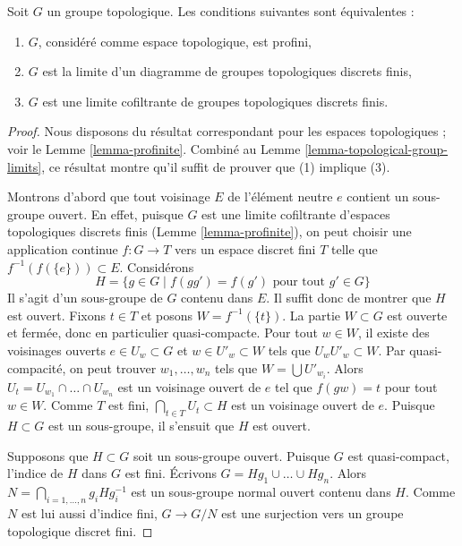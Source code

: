 \begin{lemma}
\label{lemma-profinite-group}
Soit $G$ un groupe topologique. Les conditions suivantes sont équivalentes :
\begin{enumerate}
\item $G$, considéré comme espace topologique, est profini,
\item $G$ est la limite d'un diagramme de groupes topologiques discrets finis,
\item $G$ est une limite cofiltrante de groupes topologiques discrets finis.
\end{enumerate}
\end{lemma}

\begin{proof}
Nous disposons du résultat correspondant pour les espaces topologiques ; voir
le Lemme \ref{lemma-profinite}. Combiné au
Lemme \ref{lemma-topological-group-limits}, ce résultat montre qu'il suffit de
prouver que (1) implique (3).

\medskip\noindent
Montrons d'abord que tout voisinage $E$ de l'élément neutre $e$ contient un
sous-groupe ouvert. En effet, puisque $G$ est une limite cofiltrante d'espaces
topologiques discrets finis (Lemme \ref{lemma-profinite}), on peut choisir une
application continue $f : G \to T$ vers un espace discret fini $T$ telle que
$f^{-1}(f(\{e\})) \subset E$. Considérons
$$
H = \{g \in G \mid f(gg') = f(g')\text{ pour tout }g' \in G\}
$$
Il s'agit d'un sous-groupe de $G$ contenu dans $E$. Il suffit donc de montrer
que $H$ est ouvert. Fixons $t \in T$ et posons $W = f^{-1}(\{t\})$.
La partie $W \subset G$ est ouverte et fermée, donc en particulier
quasi-compacte. Pour tout $w \in W$, il existe des voisinages ouverts
$e \in U_w \subset G$ et $w \in U'_w \subset W$ tels que
$U_wU'_w \subset W$. Par quasi-compacité, on peut trouver
$w_1, \ldots, w_n$ tels que $W = \bigcup U'_{w_i}$. Alors
$U_t = U_{w_1} \cap \ldots \cap U_{w_n}$ est un voisinage ouvert de $e$ tel
que $f(gw) = t$ pour tout $w \in W$. Comme $T$ est fini,
$\bigcap_{t \in T} U_t \subset H$ est un voisinage ouvert de $e$. Puisque
$H \subset G$ est un sous-groupe, il s'ensuit que $H$ est ouvert.

\medskip\noindent
Supposons que $H \subset G$ soit un sous-groupe ouvert. Puisque $G$ est
quasi-compact, l'indice de $H$ dans $G$ est fini. Écrivons
$G = Hg_1 \cup \ldots \cup Hg_n$. Alors
$N = \bigcap_{i = 1, \ldots, n} g_iHg_i^{-1}$ est un sous-groupe normal
ouvert contenu dans $H$. Comme $N$ est lui aussi
d'indice fini, $G \to G/N$ est une surjection vers un groupe topologique
discret fini.


\end{proof}
